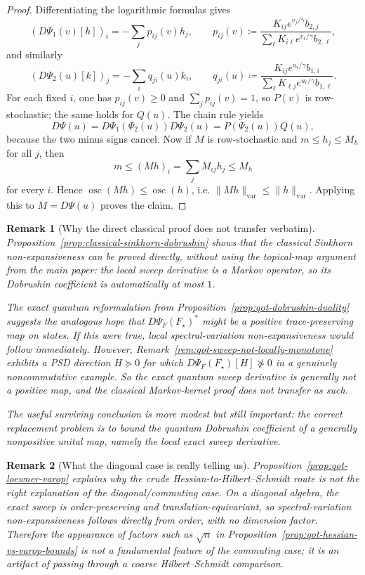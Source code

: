 \documentclass[11pt]{article}
\newcommand{\eqdef}{\coloneqq}
\theoremstyle{plain}
\newtheorem{remark}{Remark}[section]
\begin{document}
\begin{proof}
Differentiating the logarithmic formulas gives
\[
(D\Psi_1(v)[h])_i
=
-\sum_j p_{ij}(v) h_j,
\qquad
p_{ij}(v)
\eqdef
\frac{K_{ij} e^{v_j/\gamma} b_{2,j}}
{\sum_{\ell} K_{i\ell} e^{v_\ell/\gamma} b_{2,\ell}},
\]
and similarly
\[
(D\Psi_2(u)[k])_j
=
-\sum_i q_{ji}(u) k_i,
\qquad
q_{ji}(u)
\eqdef
\frac{K_{ij} e^{u_i/\gamma} b_{1,i}}
{\sum_{\ell} K_{\ell j} e^{u_\ell/\gamma} b_{1,\ell}}.
\]
For each fixed $i$, one has $p_{ij}(v)\ge 0$ and $\sum_j p_{ij}(v)=1$, so $P(v)$ is row-stochastic; the same holds for $Q(u)$.
The chain rule yields
\[
D\Psi(u)=D\Psi_1(\Psi_2(u))D\Psi_2(u)=P(\Psi_2(u))Q(u),
\]
because the two minus signs cancel.
Now if $M$ is row-stochastic and $m\le h_j\le M_h$ for all $j$, then
\[
m \le (Mh)_i = \sum_j M_{ij}h_j \le M_h
\]
for every $i$.
Hence $\operatorname{osc}(Mh)\le \operatorname{osc}(h)$, i.e.
$\|Mh\|_{\mathrm{var}}\le \|h\|_{\mathrm{var}}$.
Applying this to $M=D\Psi(u)$ proves the claim.
\end{proof}

\begin{remark}[Why the direct classical proof does not transfer verbatim]
\label{rem:qot-classical-direct-route}
Proposition~\ref{prop:classical-sinkhorn-dobrushin} shows that the classical Sinkhorn non-expansiveness can be proved \emph{directly}, without using the topical-map argument from the main paper:
the local sweep derivative is a Markov operator, so its Dobrushin coefficient is automatically at most $1$.

The exact quantum reformulation from Proposition~\ref{prop:qot-dobrushin-duality} suggests the analogous hope that $D\Psi_F(F_\star)^\ast$ might be a positive trace-preserving map on states.
If this were true, local spectral-variation non-expansiveness would follow immediately.
However, Remark~\ref{rem:qot-sweep-not-locally-monotone} exhibits a PSD direction $H\succeq 0$ for which
$D\Psi_F(F_\star)[H]\not\succeq 0$ in a genuinely noncommutative example.
So the exact quantum sweep derivative is generally \emph{not} a positive map, and the classical Markov-kernel proof does not transfer as such.

The useful surviving conclusion is more modest but still important:
the correct replacement problem is to bound the quantum Dobrushin coefficient of a generally nonpositive unital map, namely the local exact sweep derivative.
\end{remark}

\begin{remark}[What the diagonal case is really telling us]
\label{rem:qot-diagonal-diagnosis}
Proposition~\ref{prop:qot-loewner-varop} explains why the crude Hessian-to-Hilbert--Schmidt route is not the right explanation of the diagonal/commuting case.
On a diagonal algebra, the exact sweep is order-preserving and translation-equivariant, so spectral-variation non-expansiveness follows \emph{directly} from order, with no dimension factor.
Therefore the appearance of factors such as $\sqrt{n}$ in Proposition~\ref{prop:qot-hessian-vs-varop-bounds} is not a fundamental feature of the commuting case; it is an artifact of passing through a coarse Hilbert--Schmidt comparison.
\end{remark}
\end{document}
